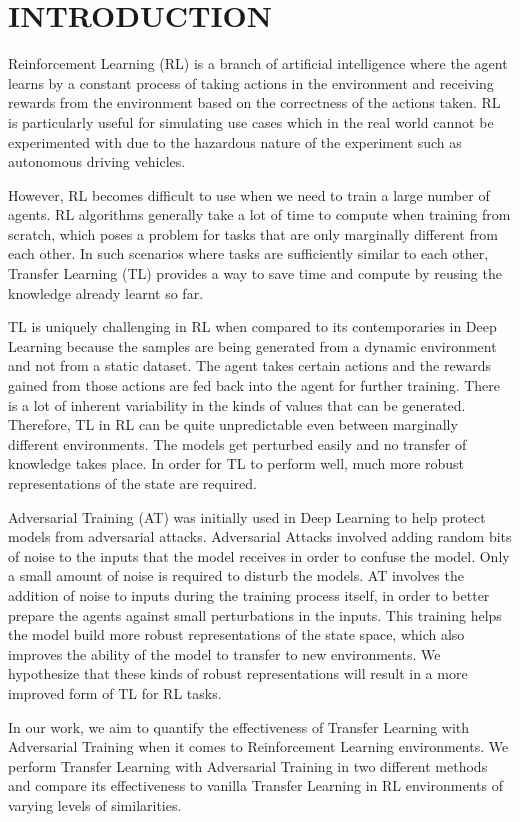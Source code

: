 
\chapter{INTRODUCTION} %

Reinforcement Learning (RL) is a branch of artificial
intelligence where the agent learns by a constant process of
taking actions in the environment and receiving rewards from
the environment based on the correctness of the actions
taken. RL is particularly useful for simulating use cases
which in the real world cannot be experimented with due to
the hazardous nature of the experiment such as autonomous
driving vehicles.

However, RL becomes difficult to use when we need to train a
large number of agents. RL algorithms generally take a lot of
time to compute when training from scratch, which poses a
problem for tasks that are only marginally different from
each other. In such scenarios where tasks are sufficiently
similar to each other, Transfer Learning (TL) provides a way
to save time and compute by reusing the knowledge already
learnt so far.

TL is uniquely challenging in RL when compared to its
contemporaries in Deep Learning because the samples are being
generated from a dynamic environment and not from a static
dataset. The agent takes certain actions and the rewards
gained from those actions are fed back into the agent for
further training. There is a lot of inherent variability in
the kinds of values that can be generated. Therefore, TL in
RL can be quite unpredictable even between marginally
different environments. The models get perturbed easily and
no transfer of knowledge takes place. In order for TL to
perform well, much more robust representations of the state
are required.

Adversarial Training (AT) was initially used in Deep Learning
to help protect models from adversarial attacks. Adversarial
Attacks involved adding random bits of noise to the inputs
that the model receives in order to confuse the model. Only a
small amount of noise is required to disturb the models. AT
involves the addition of noise to inputs during the training
process itself, in order to better prepare the agents against
small perturbations in the inputs. This training helps the
model build more robust representations of the state space,
which also improves the ability of the model to transfer to
new environments. We hypothesize that these kinds of robust
representations will result in a more improved form of TL for
RL tasks.

In our work, we aim to quantify the effectiveness of Transfer
Learning with Adversarial Training when it comes to
Reinforcement Learning environments. We perform Transfer
Learning with Adversarial Training in two different methods
and compare its effectiveness to vanilla Transfer Learning in
RL environments of varying levels of similarities.



